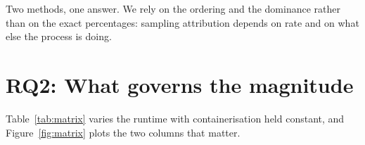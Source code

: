 \documentclass[pdflatex,sn-basic,twocolumn]{sn-jnl}%
\providecommand{\DIFaddbegin}{} %
\providecommand{\DIFaddend}{} %
\providecommand{\DIFdelbegin}{} %
\providecommand{\DIFdelend}{} %
\newcommand{\DIFscaledelfig}{0.5}
\newlength{\DIFdelgraphicswidth} %
\newlength{\DIFdelgraphicsheight} %
\newcommand{\DIFaddincludegraphics}[2][]{{\color{blue}\fbox{\DIFOincludegraphics[#1]{#2}}}} %
\newcommand{\DIFdelincludegraphics}[2][]{%
\sbox{\DIFdelgraphicsbox}{\DIFOincludegraphics[#1]{#2}}%
\settoboxwidth{\DIFdelgraphicswidth}{\DIFdelgraphicsbox} %
\settoboxtotalheight{\DIFdelgraphicsheight}{\DIFdelgraphicsbox} %
\scalebox{\DIFscaledelfig}{%
\parbox[b]{\DIFdelgraphicswidth}{\usebox{\DIFdelgraphicsbox}\\[-\baselineskip] \rule{\DIFdelgraphicswidth}{0em}}\llap{\resizebox{\DIFdelgraphicswidth}{\DIFdelgraphicsheight}{%
\setlength{\unitlength}{\DIFdelgraphicswidth}%
\begin{picture}(1,1)%
\thicklines\linethickness{2pt} %
{\color[rgb]{1,0,0}\put(0,0){\framebox(1,1){}}}%
{\color[rgb]{1,0,0}\put(0,0){\line( 1,1){1}}}%
{\color[rgb]{1,0,0}\put(0,1){\line(1,-1){1}}}%
\end{picture}%
}\hspace*{3pt}}} %
} %
\DeclareRobustCommand{\DIFaddbegin}{\DIFOaddbegin \let\includegraphics\DIFaddincludegraphics} %
\DeclareRobustCommand{\DIFaddend}{\DIFOaddend \let\includegraphics\DIFOincludegraphics} %
\DeclareRobustCommand{\DIFdelbegin}{\DIFOdelbegin \let\includegraphics\DIFdelincludegraphics} %
\DeclareRobustCommand{\DIFdelend}{\DIFOaddend \let\includegraphics\DIFOincludegraphics} %
\begin{document}
Two methods, one answer. We rely on the ordering and the dominance rather than on
the exact percentages: sampling attribution depends on rate and on what else the
process is doing.

\DIFdelbegin %
\DIFdelend \DIFaddbegin \section{RQ2: What governs the magnitude}\DIFaddend \label{sec:rq2}

Table~\ref{tab:matrix} varies the runtime with containerisation held constant,
and Figure~\ref{fig:matrix} plots the two columns that matter.
\end{document}
